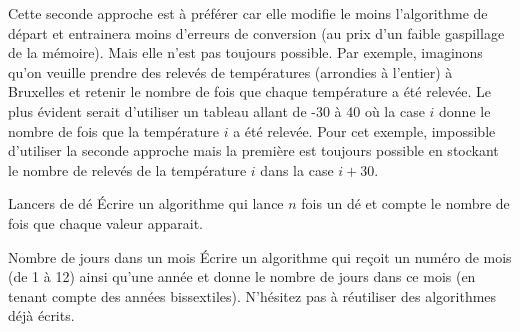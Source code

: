 		Cette seconde approche est à préférer 
		car elle modifie le moins l'algorithme de départ 
		et entrainera moins d'erreurs de conversion
		(au prix d'un faible gaspillage de la mémoire).
		Mais elle n'est pas toujours possible.
		Par exemple, imaginons qu'on veuille prendre 
		des relevés de températures (arrondies à l'entier) à Bruxelles 
		et retenir le nombre de fois que chaque température a été relevée.
		Le plus évident serait d'utiliser un tableau allant de -30 à 40
		où la case $i$ donne le nombre de fois 
		que la température $i$ a été relevée.
		Pour cet exemple, impossible d'utiliser la seconde approche
		mais la première est toujours possible en stockant
		le nombre de relevés de la température $i$ dans la case $i+30$.

		\begin{Exercice}{Lancers de dé}
			Écrire un algorithme qui lance $n$ fois un dé
			et compte le nombre de fois que chaque valeur apparait.
			\begin{LDA}
			\end{LDA}
		\end{Exercice}
		
		\begin{Exercice}{Nombre de jours dans un mois}
			Écrire un algorithme qui reçoit un numéro de mois (de 1 à 12)
			ainsi qu'une année et donne le nombre de jours dans ce mois
			(en tenant compte des années bissextiles).
			N'hésitez pas à réutiliser des algorithmes déjà écrits.
		\end{Exercice}
		
		
